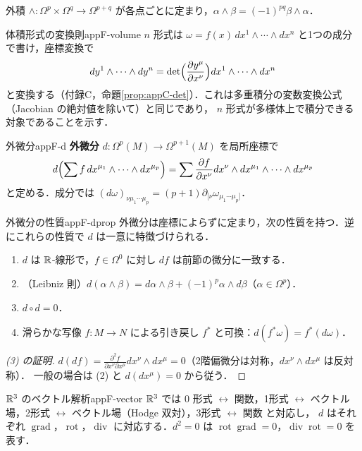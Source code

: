外積 $\wedge\colon\Omega^p\times\Omega^q\to\Omega^{p+q}$ が各点ごとに定まり，$\alpha\wedge\beta=(-1)^{pq}\beta\wedge\alpha$．

\begin{myex}{体積形式の変換則}{appF-volume}
$n$ 形式は $\omega=f(x)\,dx^1\wedge\cdots\wedge dx^n$ と1つの成分で書け，座標変換で
\[
dy^1\wedge\cdots\wedge dy^n=\det\Bigl(\frac{\partial y^\mu}{\partial x^\nu}\Bigr)dx^1\wedge\cdots\wedge dx^n
\]
と変換する（付録C，命題\ref{prop:appC-det}）．これは多重積分の変数変換公式（Jacobian の絶対値を除いて）と同じであり，
$n$ 形式が多様体上で積分できる対象であることを示す．
\end{myex}

\begin{mydef}{外微分}{appF-d}
\textbf{外微分} $d\colon\Omega^p(M)\to\Omega^{p+1}(M)$ を局所座標で
\[
d\Bigl(\sum f\,dx^{\mu_1}\wedge\cdots\wedge dx^{\mu_p}\Bigr)=\sum\frac{\partial f}{\partial x^\nu}dx^\nu\wedge dx^{\mu_1}\wedge\cdots\wedge dx^{\mu_p}
\]
と定める．成分では $(d\omega)_{\nu\mu_1\cdots\mu_p}=(p+1)\partial_{[\nu}\omega_{\mu_1\cdots\mu_p]}$．
\end{mydef}

\begin{mythm}{外微分の性質}{appF-dprop}
外微分は座標によらずに定まり，次の性質を持つ．逆にこれらの性質で $d$ は一意に特徴づけられる．
\begin{enumerate}
\item $d$ は $\mathbb{R}$-線形で，$f\in\Omega^0$ に対し $df$ は前節の微分に一致する．
\item （Leibniz 則）$d(\alpha\wedge\beta)=d\alpha\wedge\beta+(-1)^p\alpha\wedge d\beta$（$\alpha\in\Omega^p$）．
\item $d\circ d=0$．
\item 滑らかな写像 $f\colon M\to N$ による引き戻し $f^*$ と可換：$d(f^*\omega)=f^*(d\omega)$．
\end{enumerate}
\end{mythm}
\begin{proof}[(3) の証明]
$d(df)=\frac{\partial^2f}{\partial x^\nu\partial x^\mu}dx^\nu\wedge dx^\mu=0$（2階偏微分は対称，$dx^\nu\wedge dx^\mu$ は反対称）．
一般の場合は (2) と $d(dx^\mu)=0$ から従う．
\end{proof}

\begin{myex}{$\mathbb{R}^3$ のベクトル解析}{appF-vector}
$\mathbb{R}^3$ では $0$ 形式 $\leftrightarrow$ 関数，1形式 $\leftrightarrow$ ベクトル場，2形式 $\leftrightarrow$ ベクトル場（Hodge 双対），3形式 $\leftrightarrow$ 関数 と対応し，
$d$ はそれぞれ $\operatorname{grad}$，$\operatorname{rot}$，$\operatorname{div}$ に対応する．$d^2=0$ は $\operatorname{rot}\operatorname{grad}=0$，$\operatorname{div}\operatorname{rot}=0$ を表す．
\end{myex}

